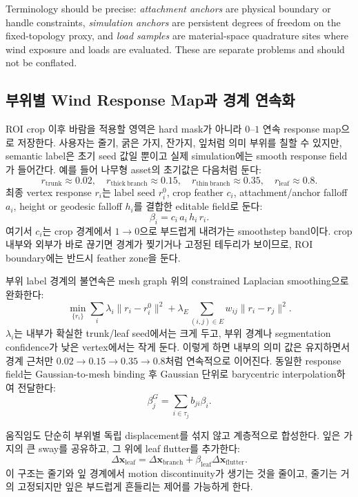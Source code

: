 \documentclass[11pt]{article}
\begin{document}
Terminology should be precise: \emph{attachment anchors} are physical boundary or handle constraints, \emph{simulation anchors} are persistent degrees of freedom on the fixed-topology proxy, and \emph{load samples} are material-space quadrature sites where wind exposure and loads are evaluated. These are separate problems and should not be conflated.

\subsection*{부위별 Wind Response Map과 경계 연속화}

ROI crop 이후 바람을 적용할 영역은 hard mask가 아니라 \(0\)--\(1\) 연속 response map으로 저장한다. 사용자는 줄기, 굵은 가지, 잔가지, 잎처럼 의미 부위를 칠할 수 있지만, semantic label은 초기 seed 값일 뿐이고 실제 simulation에는 smooth response field가 들어간다. 예를 들어 나무형 asset의 초기값은 다음처럼 둔다:
\[
  r_{\mathrm{trunk}}\approx 0.02,\quad
  r_{\mathrm{thick\ branch}}\approx 0.15,\quad
  r_{\mathrm{thin\ branch}}\approx 0.35,\quad
  r_{\mathrm{leaf}}\approx 0.8.
\]
최종 vertex response \(r_i\)는 label seed \(r_i^0\), crop feather \(c_i\), attachment/anchor falloff \(a_i\), height or geodesic falloff \(h_i\)를 결합한 editable field로 둔다:
\[
  \beta_i
  =
  c_i\,a_i\,h_i\,r_i.
\]
여기서 \(c_i\)는 crop 경계에서 \(1\rightarrow0\)으로 부드럽게 내려가는 smoothstep band이다. crop 내부와 외부가 바로 끊기면 경계가 찢기거나 고정된 테두리가 보이므로, ROI boundary에는 반드시 feather zone을 둔다.

부위 label 경계의 불연속은 mesh graph 위의 constrained Laplacian smoothing으로 완화한다:
\[
  \min_{\{r_i\}}
  \sum_i \lambda_i\|r_i-r_i^0\|^2
  +
  \lambda_E
  \sum_{(i,j)\in E}
  w_{ij}\|r_i-r_j\|^2.
\]
\(\lambda_i\)는 내부가 확실한 trunk/leaf seed에서는 크게 두고, 부위 경계나 segmentation confidence가 낮은 vertex에서는 작게 둔다. 이렇게 하면 내부의 의미 값은 유지하면서 경계 근처만 \(0.02\rightarrow0.15\rightarrow0.35\rightarrow0.8\)처럼 연속적으로 이어진다. 동일한 response field는 Gaussian-to-mesh binding 후 Gaussian 단위로 barycentric interpolation하여 전달한다:
\[
  \beta_j^G
  =
  \sum_{i\in\tau_j} b_{ji}\beta_i.
\]

움직임도 단순히 부위별 독립 displacement를 섞지 않고 계층적으로 합성한다. 잎은 가지의 큰 sway를 공유하고, 그 위에 leaf flutter를 추가한다:
\[
  \Delta \mathbf{x}_{\mathrm{leaf}}
  =
  \Delta \mathbf{x}_{\mathrm{branch}}
  +
  \beta_{\mathrm{leaf}}\Delta \mathbf{x}_{\mathrm{flutter}}.
\]
이 구조는 줄기와 잎 경계에서 motion discontinuity가 생기는 것을 줄이고, 줄기는 거의 고정되지만 잎은 부드럽게 흔들리는 제어를 가능하게 한다.
\end{document}
